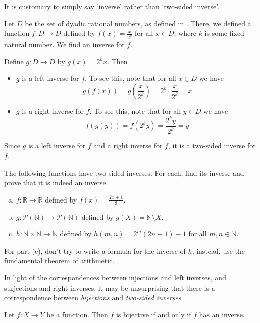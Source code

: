 It is customary to simply say `inverse' rather than `two-sided inverse'.

\begin{example}
Let $D$ be the set of dyadic rational numbers, as defined in . There, we defined a function $f : D \to D$ defined by $f(x)=\frac{x}{2^k}$ for all $x \in D$, where $k$ is some fixed natural number. We find an inverse for $f$.

Define $g : D \to D$ by $g(x) = 2^kx$. Then
\begin{itemize}
\item $g$ is a left inverse for $f$. To see this, note that for all $x \in D$ we have
\[ g(f(x)) = g(\frac{x}{2^k}) = 2^k \cdot \frac{x}{2^k} = x \]
\item $g$ is a right inverse for $f$. To see this, note that for all $y \in D$ we have
\[ f(g(y)) = f(2^ky) = \frac{2^ky}{2^k} = y \]
\end{itemize}
Since $g$ is a left inverse for $f$ and a right inverse for $f$, it is a two-sided inverse for $f$.
\end{example}

\begin{exercise}
\label{exFindTwoSidedInverses}
The following functions have two-sided inverses. For each, find its inverse and prove that it is indeed an inverse.
\begin{enumerate}[(a)]
\item $f : \mathbb{R} \to \mathbb{R}$ defined by $f(x)=\frac{2x+1}{3}$.
\item $g : \mathcal{P}(\mathbb{N}) \to \mathcal{P}(\mathbb{N})$ defined by $g(X) = \mathbb{N} \setminus X$.
\item $h : \mathbb{N} \times \mathbb{N} \to \mathbb{N}$ defined by $h(m,n) = 2^m(2n+1)-1$ for all $m,n \in \mathbb{N}$.
\end{enumerate}
\begin{backhint}
For part (c), don't try to write a formula for the inverse of $h$; instead, use the fundamental theorem of arithmetic.
\end{backhint}
\end{exercise}

In light of the correspondences between injections and left inverses, and surjections and right inverses, it may be unsurprising that there is a correspondence between \textit{bijections} and \textit{two-sided inverses}.

\begin{exercise}
\label{exBijectiveIffHasInverse}
Let $f : X \to Y$ be a function. Then $f$ is bijective if and only if $f$ has an inverse.
\end{exercise}

